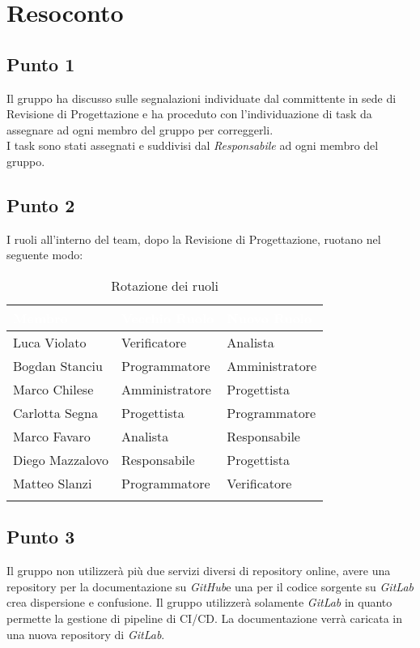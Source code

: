 \section{Resoconto}

\subsection{Punto 1}
Il gruppo ha discusso sulle segnalazioni individuate dal committente in sede di Revisione di Progettazione e ha proceduto con l'individuazione di task da assegnare ad ogni membro del gruppo per correggerli.
\\
I task sono stati assegnati e suddivisi dal \textit{Responsabile} ad ogni membro del gruppo.

\subsection{Punto 2}
I ruoli all'interno del team, dopo la Revisione di Progettazione, ruotano nel seguente modo:\\

\begin{center}
	\begin{longtable}[c]{|m{}|m{}|m{}|} 
		\hline
		\rowcolor{bluelogo}\textbf{\textcolor{white}{Membro}} & \textbf{\textcolor{white}{Vecchio Ruolo}} & \textbf{\textcolor{white}{Nuovo Ruolo}}\\
		\hline
		\hline
		Luca Violato & Verificatore & Analista \\
		\hline
		\rowcolor{grigio}Bogdan Stanciu & Programmatore & Amministratore \\
		\hline
		Marco Chilese & Amministratore & Progettista\\
		\hline
		\rowcolor{grigio}Carlotta Segna & Progettista & Programmatore\\
		\hline
		Marco Favaro & Analista & Responsabile \\
		\hline
		\rowcolor{grigio} Diego Mazzalovo & Responsabile & Progettista\\
		\hline
		Matteo Slanzi & Programmatore & Verificatore\\
		\hline
		\caption{Rotazione dei ruoli}
	\end{longtable}

\end{center}
	

\subsection{Punto 3}
Il gruppo non utilizzerà più due servizi diversi di repository online, avere una repository per la documentazione su \textit{GitHub}\glossario e una per il codice sorgente su \textit{GitLab} crea dispersione e confusione. Il gruppo utilizzerà solamente \textit{GitLab} in quanto permette la gestione di pipeline di CI/CD\glossario. La documentazione verrà caricata in una nuova repository di \textit{GitLab}.

